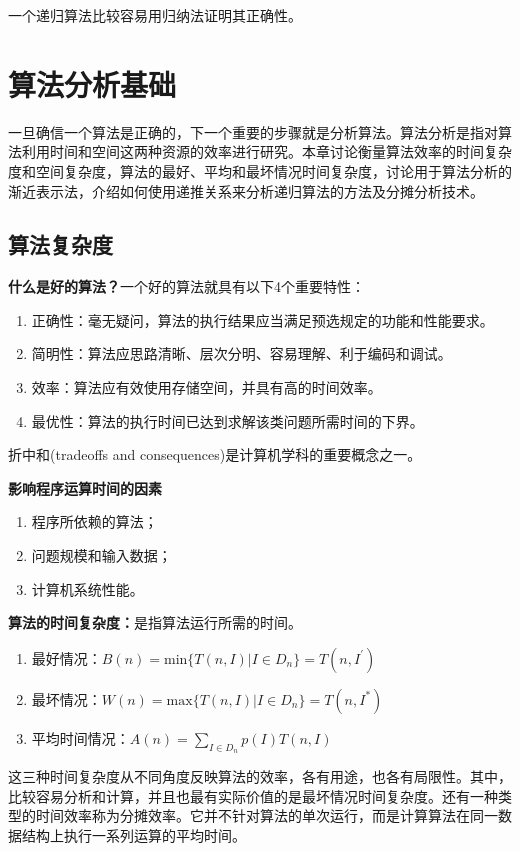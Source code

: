 一个递归算法比较容易用归纳法证明其正确性。
%
%
%


\section{算法分析基础}
一旦确信一个算法是正确的，下一个重要的步骤就是分析算法。算法分析是指对算法利用时间和空间这两种资源的效率进行研究。本章讨论衡量算法效率的时间复杂度和空间复杂度，算法的最好、平均和最坏情况时间复杂度，讨论用于算法分析的渐近表示法，介绍如何使用递推关系来分析递归算法的方法及分摊分析技术。

\subsection*{算法复杂度}
\textbf{什么是好的算法？}一个好的算法就具有以下4个重要特性：
\begin{enumerate}
	\item 正确性：毫无疑问，算法的执行结果应当满足预选规定的功能和性能要求。
	\item 简明性：算法应思路清晰、层次分明、容易理解、利于编码和调试。
	\item 效率：算法应有效使用存储空间，并具有高的时间效率。
	\item 最优性：算法的执行时间已达到求解该类问题所需时间的下界。
\end{enumerate}
折中和(tradeoffs and consequences)是计算机学科的重要概念之一。

\textbf{影响程序运算时间的因素}
\begin{enumerate}
	\item 程序所依赖的算法；
	\item 问题规模和输入数据；
	\item 计算机系统性能。 
\end{enumerate}

\textbf{算法的时间复杂度：}是指算法运行所需的时间。
\begin{enumerate}
	\item 最好情况：$B(n)=\mathrm{min}\{T(n,I)|I\in D_n\}=T(n,I^{'})$
	\item 最坏情况：$W(n)=\mathrm{max}\{T(n,I)|I\in D_n\}=T(n,I^{*})$
	\item 平均时间情况：$A(n)=\sum\limits_{I\in D_n}p(I)T(n,I)$
\end{enumerate}
这三种时间复杂度从不同角度反映算法的效率，各有用途，也各有局限性。其中，比较容易分析和计算，并且也最有实际价值的是最坏情况时间复杂度。还有一种类型的时间效率称为分摊效率。它并不针对算法的单次运行，而是计算算法在同一数据结构上执行一系列运算的平均时间。

